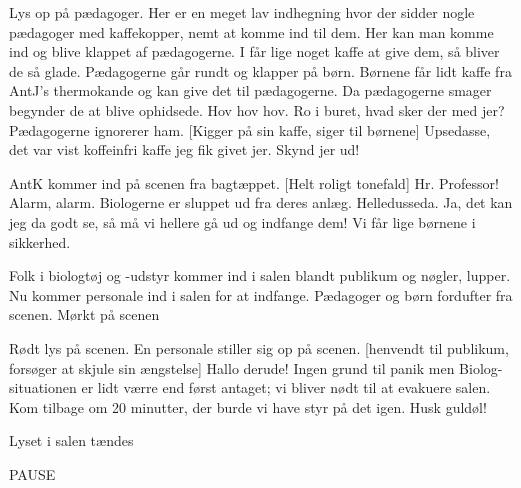 \documentclass[a4paper,12pt]{article}
\begin{document}
\begin{sketch}
\scene Lys op på pædagoger. Her er en meget lav indhegning hvor der sidder nogle pædagoger med kaffekopper, nemt at komme ind til dem.
Her kan man komme ind og blive klappet af pædagogerne. I får lige noget kaffe at give dem, så bliver de så glade. 
\scene Pædagogerne går rundt og klapper på børn. Børnene får lidt kaffe fra AntJ's thermokande og kan give det til pædagogerne. Da pædagogerne smager begynder de at blive ophidsede. 
Hov hov hov. Ro i buret, hvad sker der med jer? 
\scene Pædagogerne ignorerer ham. 
[Kigger på sin kaffe, siger til børnene] Upsedasse, det var vist koffeinfri kaffe jeg fik givet jer. Skynd jer ud!

\scene AntK kommer ind på scenen fra bagtæppet. 
[Helt roligt tonefald] Hr. Professor! Alarm, alarm. Biologerne er sluppet ud fra deres anlæg. 
Helledusseda. Ja, det kan jeg da godt se, så må vi hellere gå ud og indfange dem! Vi får lige børnene i sikkerhed. 

\scene Folk i biologtøj og -udstyr kommer ind i salen blandt publikum og nøgler, lupper. Nu kommer personale ind i salen for at indfange. Pædagoger og børn fordufter fra scenen.
\scene Mørkt på scenen

\scene Rødt lys på scenen. En personale stiller sig op på scenen.   
[henvendt til publikum, forsøger at skjule sin ængstelse] Hallo derude! Ingen grund til panik  men Biolog-situationen er lidt værre end først antaget; vi bliver nødt til at evakuere salen. Kom tilbage om 20 minutter, der burde vi have styr på det igen. Husk guldøl!

\scene Lyset i salen tændes 

PAUSE


\end{sketch}
\end{document}
